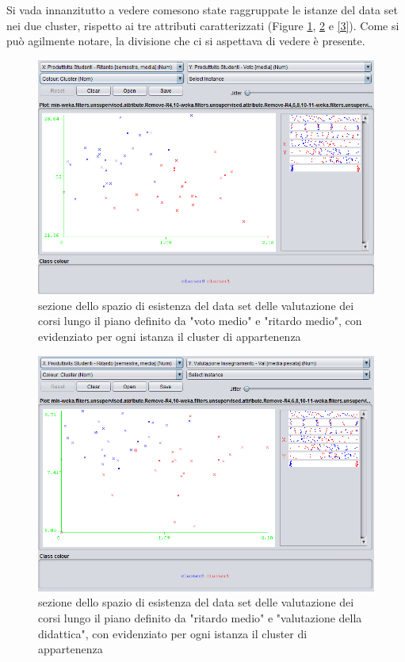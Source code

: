         Si vada innanzitutto a vedere comesono state raggruppate le istanze del data set nei due cluster, rispetto ai tre attributi caratterizzati (Figure \ref{1}, \ref{2} e \ref{3}). Come si può agilmente notare, la divisione che ci si aspettava di vedere è presente.\\

        \begin{figure}
            \centering
            \caption{sezione dello spazio di esistenza del data set delle valutazione dei corsi lungo il piano definito da "voto medio" e "ritardo medio", con evidenziato per ogni istanza il cluster di appartenenza}
            \label{1}
            \includegraphics[scale=0.5]{../cluster/min_kmeans_2cl_attr1.png}
        \end{figure}

        \begin{figure}
            \centering
            \caption{sezione dello spazio di esistenza del data set delle valutazione dei corsi lungo il piano definito da "ritardo medio" e "valutazione della didattica", con evidenziato per ogni istanza il cluster di appartenenza}
            \label{2}
            \includegraphics[scale=0.5]{../cluster/min_kmeans_2cl_attr2.png}
        \end{figure}

